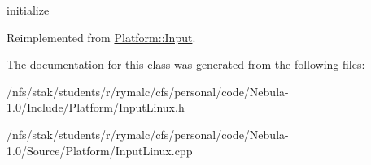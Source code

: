initialize 

Reimplemented from \hyperlink{classPlatform_1_1Input_acc69f9603dbb49644d2c6f4653f4b64f}{Platform::Input}.

The documentation for this class was generated from the following files:\begin{DoxyCompactItemize}
\item 
/nfs/stak/students/r/rymalc/cfs/personal/code/Nebula-\/1.0/Include/Platform/InputLinux.h\item 
/nfs/stak/students/r/rymalc/cfs/personal/code/Nebula-\/1.0/Source/Platform/InputLinux.cpp\end{DoxyCompactItemize}
